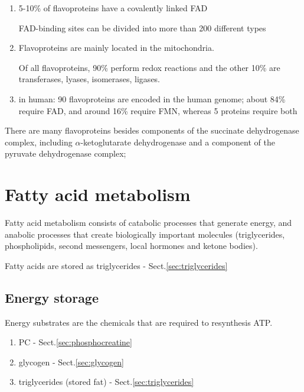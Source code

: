 \begin{enumerate}
  \item  5-10\% of flavoproteins have a covalently linked FAD
  
  FAD-binding sites can be divided into more than 200 different types
  
  \item Flavoproteins are mainly located in the mitochondria.
  
  Of all flavoproteins, 90\% perform redox reactions and the other 10\% are
  transferases, lyases, isomerases, ligases.
  
  
  \item in human: 90 flavoproteins are encoded in the human genome; about 84\%
  require FAD, and around 16\% require FMN, whereas 5 proteins require both
\end{enumerate}

There are many flavoproteins besides components of the succinate dehydrogenase
complex, including $\alpha$-ketoglutarate dehydrogenase and a component of the
pyruvate dehydrogenase complex;



\section{Fatty acid metabolism}
\label{sec:catabolic-energy-metabolism}
\label{sec:catabolic-reaction}
\label{sec:fatty-acid-metabolism}

Fatty acid metabolism consists of catabolic processes that generate energy, and
anabolic processes that create biologically important molecules (triglycerides,
phospholipids, second messengers, local hormones and ketone bodies).

Fatty acids are stored as triglycerides - Sect.\ref{sec:triglycerides}


\subsection{Energy storage}
\label{sec:energy-storage}


Energy substrates are the chemicals that are required to resynthesis ATP.
\begin{enumerate}
  \item PC - Sect.\ref{sec:phosphocreatine}

  \item glycogen - Sect.\ref{sec:glycogen}

  \item triglycerides (stored fat) - Sect.\ref{sec:triglycerides}

\end{enumerate}

